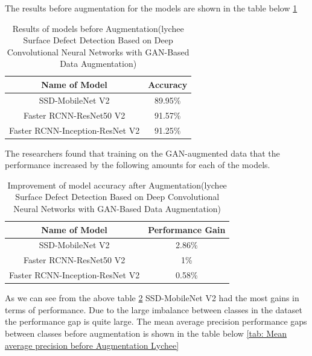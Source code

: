 The results before augmentation for the models are shown in the table below \ref{tab:Results of models before Augmentation Lychee}
\begin{table}[H]
    \centering
    {\begin{tabular}{|c|c|}
         \hline
         Name of Model
         & Accuracy\\
         \hline
         SSD-MobileNet V2 & 89.95\%\\
         Faster RCNN-ResNet50 V2 & 91.57\%\\
         Faster RCNN-Inception-ResNet V2 & 91.25\%\\
         \hline
        \end{tabular}}
    \caption{Results of models before Augmentation(lychee Surface Defect Detection Based on Deep Convolutional
Neural Networks with GAN-Based Data Augmentation)\cite{litReviewLychee}}
    \label{tab:Results of models before Augmentation Lychee}
\end{table}
The researchers found that training on the GAN-augmented data that the performance increased by the following amounts for each of the models.
\begin{table}[H]
    \centering
    {\begin{tabular}{|c|c|}
         \hline
         Name of Model
         & Performance Gain\\
         \hline
         SSD-MobileNet V2 & 2.86\%\\
         Faster RCNN-ResNet50 V2 & 1\%\\
         Faster RCNN-Inception-ResNet V2 & 0.58\%\\
         \hline
        \end{tabular}}
    \caption{Improvement of model accuracy after Augmentation(lychee Surface Defect Detection Based on Deep Convolutional
Neural Networks with GAN-Based Data Augmentation)\cite{litReviewLychee}}
    \label{tab:Improvement of model accuracy after Augmentation Lychee}
\end{table}
As we can see from the above table \ref{tab:Improvement of model accuracy after Augmentation Lychee} SSD-MobileNet V2 had the most gains in terms of performance.  Due to the large imbalance between classes in the dataset the performance gap is quite large.  The mean average precision performance gaps between classes before augmentation is shown in the table below \ref{tab: Mean average precision before Augmentation Lychee}
